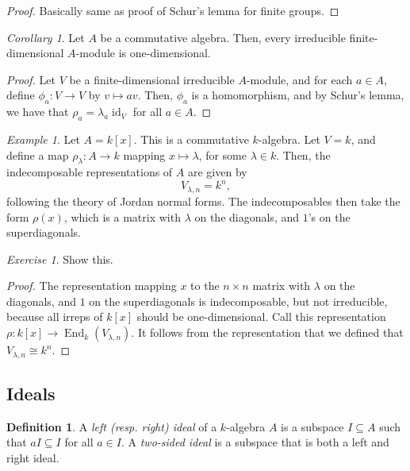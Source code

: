 \documentclass[a4paper]{report}
\theoremstyle{definition}
\newtheorem{definition}{Definition}
\theoremstyle{remark}
\theoremstyle{proposition}
\theoremstyle{conjecture}
\theoremstyle{lemma}
\theoremstyle{corollary}
\newtheorem{corollary}{Corollary}
\theoremstyle{exercise}
\newtheorem{exercise}{Exercise}
\theoremstyle{example}
\newtheorem{example}{Example}
\newcommand{\on}{\operatorname}
\begin{document}
\begin{proof}
    Basically same as proof of Schur's lemma for finite groups.
\end{proof}

\begin{corollary}
    Let $A$ be a commutative algebra. Then, every irreducible finite-dimensional
    $A$-module is one-dimensional.
\end{corollary}

\begin{proof}
    Let $V$ be a finite-dimensional irreducible $A$-module, 
    and for each $a\in A$, define $\phi_a : V \to V$ by 
    $v\mapsto av$. Then, $\phi_a$ is a homomorphism, and by 
    Schur's lemma, we have that $\rho_a = \lambda_a\on{id}_V$ for all $a\in A$.
\end{proof}

\begin{example}
    Let $A = k[x]$. This is a commutative $k$-algebra. Let $V = k$,
    and define a map 
    $\rho_\lambda : A \to k$ mapping $x\mapsto \lambda$, for some $\lambda\in k$.
    Then, the indecomposable representations of $A$ are given by 
    $$V_{\lambda,n} = k^n,$$
    following the theory of Jordan normal forms. The indecomposables then take
    the form $\rho(x)$, which is a matrix with $\lambda$ on the diagonals,
    and $1$'s on the superdiagonals.
    \begin{exercise}
        Show this.
    \end{exercise}

    \begin{proof}
        The representation mapping $x$ to the $n\times n$ matrix with 
        $\lambda$ on 
        the diagonals, and $1$ on the superdiagonals is indecomposable,
        but not irreducible, because all irreps of $k[x]$ should be 
        one-dimensional. Call this representation
        $\rho : k[x] \to \on{End}_k(V_{\lambda,n})$.
        It follows from the representation that we defined that 
        $V_{\lambda,n}\cong k^n$.
    \end{proof}
\end{example}

\subsection{Ideals}

\begin{definition}
    A \emph{left (resp. right) ideal} of a $k$-algebra $A$ is a subspace 
    $I\subseteq A$ such that $aI\subseteq I$ for all $a\in I$.
    A \emph{two-sided ideal} is a subspace that is both a left and right
    ideal.
\end{definition}
\end{document}
